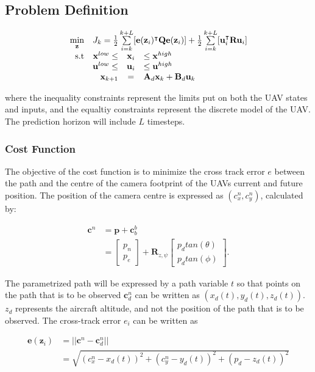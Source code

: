 \subsection*{Problem Definition}

\begin{equation}
	\begin{array}{rrclcl}
		\displaystyle \min_{\mathbf{z}} & \multicolumn{3}{l}{J_k = \frac{1}{2} \sum\limits_{i=k}^{k+L} [\mathbf{e}(\mathbf{z}_i)^\intercal \mathbf{Q} \mathbf{e}(\mathbf{z}_i)] + \frac{1}{2} \sum\limits_{i=k}^{k+L} [\mathbf{u}_i^\intercal \mathbf{R} \mathbf{u}_i]}\\
		\textrm{s.t}
		& \mathbf{x}^{low} \leq & \mathbf{x}_i & \leq \mathbf{x}^{high} \\
		& \mathbf{u}^{low} \leq & \mathbf{u}_i & \leq \mathbf{u}^{high} \\
		& \displaystyle \mathbf{x}_{k+1} & = & \mathbf{A}_d \mathbf{x}_k + \mathbf{B}_d \mathbf{u}_k
	\end{array}
\end{equation}

where the inequality constraints represent the limits put on both the UAV states and inputs, and the equaltiy constraints represent the discrete model of the UAV. The prediction horizon will include $L$ timesteps.


\subsubsection*{Cost Function}

The objective of the cost function is to minimize the cross track error $e$ between the path and the centre of the camera footprint of the UAVs current and future position. The position of the camera centre is expressed as $(c_x^n, c_y^n)$, calculated by:

\begin{equation}
\begin{split}
	\mathbf{c}^n & = \mathbf{p} + \mathbf{c}_b^b \\
	& =
	\begin{bmatrix}
		p_n \\ p_e
	\end{bmatrix}
	+ \mathbf{R}_{z,\psi}
	\begin{bmatrix}
		p_d tan(\theta) \\ p_d tan(\phi)
	\end{bmatrix}.
\end{split}
\end{equation}

The parametrized path will be expressed by a path variable $t$ so that points on the path that is to be observed $\mathbf{c}_d^n$ can be written as $(x_d(t), y_d(t), z_d(t))$. $z_d$ represents the aircraft altitude, and not the position of the path that is to be observed. The cross-track error $e_i$ can be written as

\begin{equation}
\begin{split}
	\mathbf{e}(\mathbf{z}_i) & = ||\mathbf{c}^n - \mathbf{c}^n_d|| \\
	& = \sqrt{(c_x^n - x_d(t))^2 + (c_y^n - y_d(t))^2 + (p_d - z_d(t))^2}
\end{split}
\end{equation}